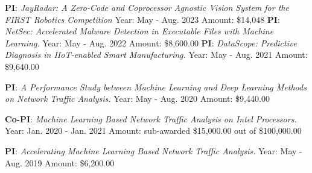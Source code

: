 \documentclass[11pt]{moderncv}
\begin{document}
%
{\textbf{PI}: \textit{JayRadar: A Zero-Code and Coprocessor Agnostic Vision System for the FIRST Robotics Competition} \newline
	Year: May - Aug. 2023 \newline
	Amount: \$14,048
}
%
{\textbf{PI}: \textit{NetSec: Accelerated Malware Detection in Executable Files with Machine Learning.} \newline
	Year: May - Aug. 2022 \newline
	Amount: \$8,600.00
}
%
{\textbf{PI}: \textit{DataScope: Predictive Diagnosis in IIoT-enabled Smart Manufacturing.} \newline
	Year: May - Aug. 2021 \newline
	Amount: \$9,640.00
}

%
{\textbf{PI}: \textit{A Performance Study between Machine Learning and Deep Learning Methods on	Network Traffic Analysis.} \newline
	Year: May - Aug. 2020 \newline
	Amount: \$9,440.00
}

%
{\textbf{Co-PI}: \textit{Machine Learning Based Network Traffic Analysis on Intel Processors.} \newline
	Year: Jan. 2020 - Jan. 2021 \newline
	Amount: sub-awarded \$15,000.00 out of \$100,000.00
}

%
{\textbf{PI}: \textit{Accelerating Machine Learning Based Network Traffic Analysis.} \newline
	Year: May - Aug. 2019 \newline
	Amount: \$6,200.00
}
\end{document}
